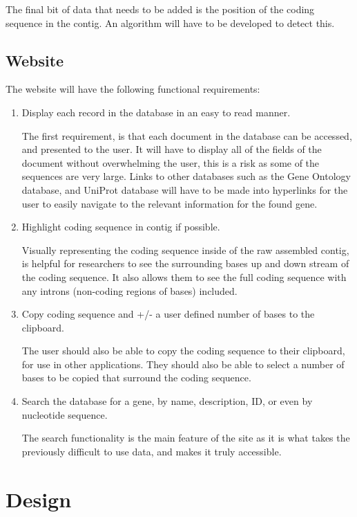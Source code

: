 The final bit of data that needs to be added is the position of the coding sequence in the contig. An algorithm will have to be developed to detect this.

\subsection{Website}
The website will have the following functional requirements: 

\begin{enumerate}[label=FR\arabic*]
  \item Display each record in the database in an easy to read manner. 

    The first requirement, is that each document in the database can be accessed, and presented to the user. It will have to display all of the fields of the document without overwhelming the user, this is a risk as some of the sequences are very large. Links to other databases such as the Gene Ontology database, and UniProt database will have to be made into hyperlinks for the user to easily navigate to the relevant information for the found gene. 

  \item Highlight coding sequence in contig if possible.

    Visually representing the coding sequence inside of the raw assembled contig, is helpful for researchers to see the surrounding bases up and down stream of the coding sequence. It also allows them to see the full coding sequence with any introns (non-coding regions of bases) included. 

  \item Copy coding sequence and +/- a user defined number of bases to the clipboard.

    The user should also be able to copy the coding sequence to their clipboard, for use in other applications. They should also be able to select a number of bases to be copied that surround the coding sequence. 

  \item Search the database for a gene, by name, description, ID, or even by nucleotide sequence. 

    The search functionality is the main feature of the site as it is what takes the previously difficult to use data, and makes it truly accessible. 
\end{enumerate}

\section{Design}

